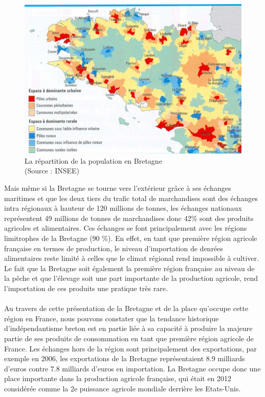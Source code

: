 \documentclass[a4paper,12pt]{report}
\begin{document}
			\begin{figure}[!h]
			\centering
			\includegraphics[scale=3.25]{Illustrations/DensitePopulationBretagne.jpg}
			\caption{La répartition de la population en Bretagne\\(Source : INSEE)}
			\label{DensitePopulationBretagne}
			\end{figure}						
			
			Mais même si la Bretagne se tourne vers l’extérieur grâce à ses échanges maritimes et que les deux tiers du trafic total de marchandises sont des échanges intra régionaux à hauteur de 120 millions de tonnes, les échanges nationaux représentent 49 millions de tonnes de marchandises donc 42\% sont des produits agricoles et alimentaires\cite{InfrastructureConnecterBretagneMondeCCI}. Ces échanges se font principalement avec les régions limitrophes de la Bretagne (90 \%). En effet, en tant que première région agricole française en termes de production, le niveau d’importation de denrées alimentaires reste limité à celles que le climat régional rend impossible à cultiver. Le fait que la Bretagne soit également la première région française au niveau de la pêche et que l’élevage soit une part importante de la production agricole, rend l’importation de ces produits une pratique très rare.
			
			\paragraph{}Au travers de cette présentation de la Bretagne et de la place qu’occupe cette région en France, nous pouvons constater que la tendance historique d’indépendantisme breton est en partie liée à sa capacité à produire la majeure partie de ses produits de consommation en tant que première région agricole de France. Les échanges hors de la région sont principalement des exportations, par exemple en 2006, les exportations de la Bretagne représentaient 8.9 milliards d’euros contre 7.8 milliards d’euros en importation. La Bretagne occupe donc une place importante dans la production agricole française, qui était en 2012 considérée comme la 2e puissance agricole mondiale derrière les Etats-Unis.
			
\end{document}
